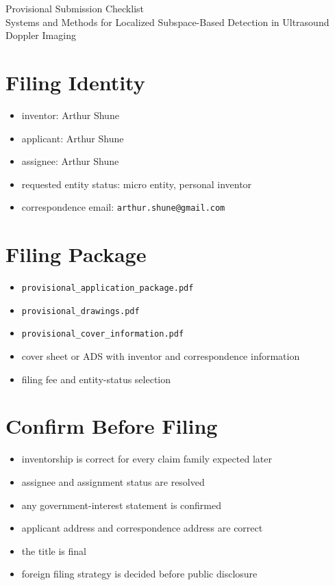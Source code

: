 \documentclass[11pt]{article}
\begin{document}
\begin{center}
{\Large Provisional Submission Checklist}\\[0.5em]
{\large Systems and Methods for Localized Subspace-Based Detection in Ultrasound Doppler Imaging}
\end{center}

\section*{Filing Identity}
\begin{itemize}
\item inventor: Arthur Shune
\item applicant: Arthur Shune
\item assignee: Arthur Shune
\item requested entity status: micro entity, personal inventor
\item correspondence email: \texttt{arthur.shune@gmail.com}
\end{itemize}

\section*{Filing Package}
\begin{itemize}
\item \texttt{provisional\_application\_package.pdf}
\item \texttt{provisional\_drawings.pdf}
\item \texttt{provisional\_cover\_information.pdf}
\item cover sheet or ADS with inventor and correspondence information
\item filing fee and entity-status selection
\end{itemize}

\section*{Confirm Before Filing}
\begin{itemize}
\item inventorship is correct for every claim family expected later
\item assignee and assignment status are resolved
\item any government-interest statement is confirmed
\item applicant address and correspondence address are correct
\item the title is final
\item foreign filing strategy is decided before public disclosure
\end{itemize}
\end{document}
